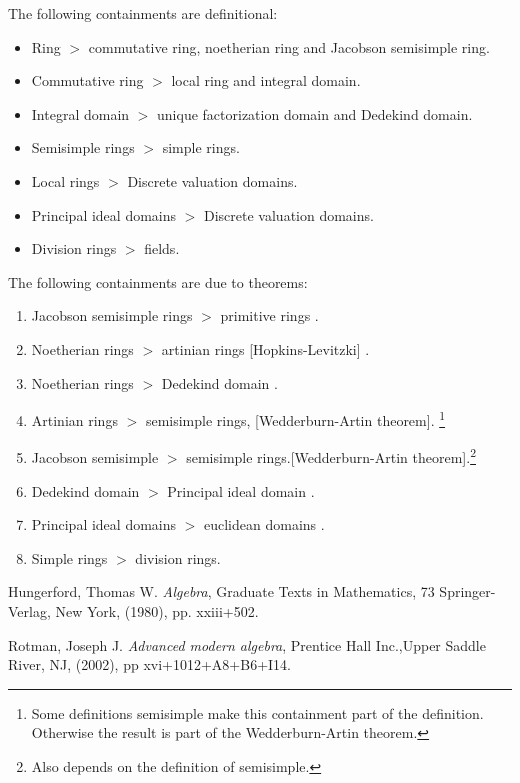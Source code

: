 \documentclass[12pt]{article}
\begin{document}
The following containments are definitional:
\begin{itemize}
\item Ring $>$ commutative ring, noetherian ring and Jacobson semisimple ring.
\item Commutative ring $>$ local ring and integral domain.
\item Integral domain $>$ unique factorization domain and Dedekind domain.
\item Semisimple rings $>$ simple rings.
\item Local rings $>$ Discrete valuation domains.
\item Principal ideal domains $>$ Discrete valuation domains.
\item Division rings $>$ fields.
\end{itemize}

The following containments are due to theorems:
\begin{enumerate}
\item Jacobson semisimple rings $>$ primitive rings \cite[p. 571]{Rot}.
\item Noetherian rings $>$ artinian rings [Hopkins-Levitzki] \cite[Theorem 8.46]{Rot}.
\item Noetherian rings $>$ Dedekind domain \cite[Theorem VIII.6.10]{Hungerford}.
\item Artinian rings $>$ semisimple rings, [Wedderburn-Artin theorem].
\footnote{Some definitions semisimple make this containment part of the definition.  Otherwise the result is part of the Wedderburn-Artin theorem.}
\item Jacobson semisimple $>$ semisimple rings.[Wedderburn-Artin theorem].\footnote{Also depends on the definition of semisimple.}
\item Dedekind domain $>$ Principal ideal domain \cite[p. 401]{Hungerford}.
\item Principal ideal domains $>$ euclidean domains \cite[Theorem 3.60]{Rot}.
\item Simple rings $>$ division rings.
\end{enumerate}


\providecommand{\bysame}{\leavevmode\hbox to3em{\hrulefill}\thinspace}
\providecommand{\MR}{\relax\ifhmode\unskip\space\fi MR }
\providecommand{\MRhref}[2]{%
\href{http://www.ams.org/mathscinet-getitem?mr=#1}{#2}
}
\providecommand{\href}[2]{#2}
\begin{thebibliography}{10}

Hungerford, Thomas W.
\emph{Algebra}, Graduate Texts in Mathematics, 73
Springer-Verlag, New York, (1980), pp. xxiii+502.

Rotman, Joseph J.
\emph{Advanced modern algebra},
Prentice Hall Inc.,Upper Saddle River, NJ, (2002), pp {xvi+1012+A8+B6+I14}.
\end{thebibliography}

\end{document}
